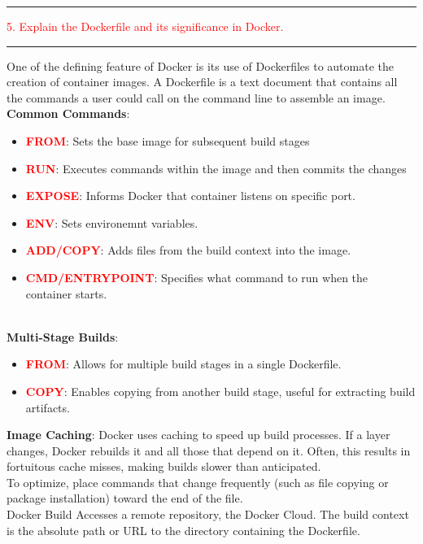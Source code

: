 \documentclass{article}
\begin{document}
\noindent
{\color{red} \rule{\linewidth}{0.5mm}}
\textcolor{red}{5. Explain the Dockerfile and its significance in Docker.} \\
\noindent
{\color{red} \rule{\linewidth}{0.5mm}}
One of the defining feature of Docker is its use of Dockerfiles to automate the creation of container images. A Dockerfile is a text document that contains all the commands a user could call on the command line to assemble an image. \\
\textbf{Common Commands}:
\begin{itemize}
    \item \textbf{\textcolor{Red}{FROM}}: \textcolor{PineGreen}{Sets the base image for subsequent build stages}
    \item \textbf{\textcolor{Red}{RUN}}: \textcolor{PineGreen}{Executes commands within the image and then commits the changes}
    \item \textbf{\textcolor{Red}{EXPOSE}}: \textcolor{PineGreen}{Informs Docker that container listens on specific port.}
    \item \textbf{\textcolor{Red}{ENV}}: \textcolor{PineGreen}{Sets environemnt variables.}
    \item \textbf{\textcolor{Red}{ADD/COPY}}: \textcolor{PineGreen}{Adds files from the build context into the image.}
    \item \textbf{\textcolor{Red}{CMD/ENTRYPOINT}}: \textcolor{PineGreen}{Specifies what command to run when the container starts. }
\end{itemize}
\\
\textbf{Multi-Stage Builds}:
\begin{itemize}
    \item \textbf{\textcolor{Red}{FROM}}: \textcolor{PineGreen}{Allows for multiple build stages in a single Dockerfile.}
    \item \textbf{\textcolor{Red}{COPY}}: \textcolor{PineGreen}{Enables copying from another build stage, useful for extracting build artifacts. }
\end{itemize}
\textbf{Image Caching}:
Docker uses caching to speed up build processes. If a layer changes, Docker rebuilds it and all those that depend on it. Often, this results in fortuitous cache misses, making builds slower than anticipated. \\
To optimize, place commands that change frequently (such as file copying or package installation) toward the end of the file. \\
Docker Build Accesses a remote repository, the Docker Cloud. The build context is the absolute path or URL to the directory containing the Dockerfile. 
\end{document}
